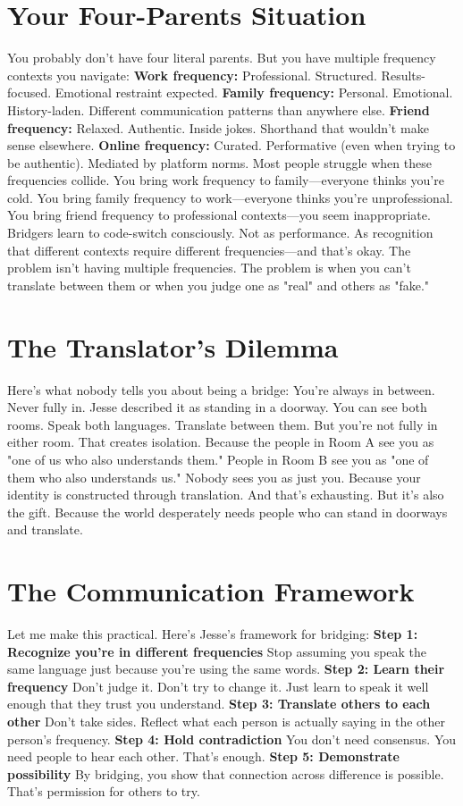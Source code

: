 \documentclass[12pt,openany]{book}
\begin{document}
\section{Your Four-Parents Situation}

You probably don't have four literal parents. But you have multiple frequency contexts you navigate:
\textbf{Work frequency:} Professional. Structured. Results-focused. Emotional restraint expected.
\textbf{Family frequency:} Personal. Emotional. History-laden. Different communication patterns than anywhere else.
\textbf{Friend frequency:} Relaxed. Authentic. Inside jokes. Shorthand that wouldn't make sense elsewhere.
\textbf{Online frequency:} Curated. Performative (even when trying to be authentic). Mediated by platform norms.
Most people struggle when these frequencies collide.
You bring work frequency to family—everyone thinks you're cold. You bring family frequency to work—everyone thinks you're unprofessional. You bring friend frequency to professional contexts—you seem inappropriate.
Bridgers learn to code-switch consciously.
Not as performance. As recognition that different contexts require different frequencies—and that's okay.
The problem isn't having multiple frequencies. The problem is when you can't translate between them or when you judge one as "real" and others as "fake."

\section{The Translator's Dilemma}

Here's what nobody tells you about being a bridge:
You're always in between. Never fully in.
Jesse described it as standing in a doorway. You can see both rooms. Speak both languages. Translate between them.
But you're not fully in either room.
That creates isolation. Because the people in Room A see you as "one of us who also understands them." People in Room B see you as "one of them who also understands us."
Nobody sees you as just you. Because your identity is constructed through translation.
And that's exhausting. But it's also the gift.
Because the world desperately needs people who can stand in doorways and translate.

\section{The Communication Framework}

Let me make this practical. Here's Jesse's framework for bridging:
\textbf{Step 1: Recognize you're in different frequencies}
Stop assuming you speak the same language just because you're using the same words.
\textbf{Step 2: Learn their frequency}
Don't judge it. Don't try to change it. Just learn to speak it well enough that they trust you understand.
\textbf{Step 3: Translate others to each other}
Don't take sides. Reflect what each person is actually saying in the other person's frequency.
\textbf{Step 4: Hold contradiction}
You don't need consensus. You need people to hear each other. That's enough.
\textbf{Step 5: Demonstrate possibility}
By bridging, you show that connection across difference is possible. That's permission for others to try.
\end{document}
